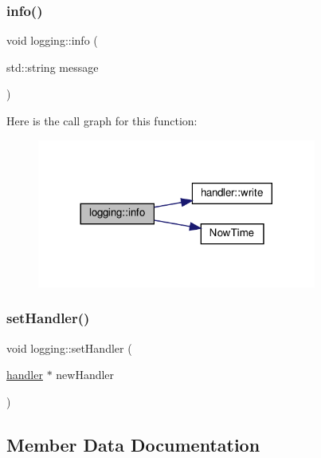 \subsubsection{\texorpdfstring{info()}{info()}}
{\footnotesize\ttfamily void logging\+::info (\begin{DoxyParamCaption}\item[{std\+::string}]{message }\end{DoxyParamCaption})}

Here is the call graph for this function\+:\nopagebreak
\begin{figure}[H]
\begin{center}
\leavevmode
\includegraphics[width=260pt]{d4/d8d/classlogging_aa15fabd099ea702ad39a8bb82e56d56c_cgraph}
\end{center}
\end{figure}
\mbox{\label{classlogging_a3df699bc82c58695050e68f28fa4bf39}} 
\subsubsection{\texorpdfstring{set\+Handler()}{setHandler()}}
{\footnotesize\ttfamily void logging\+::set\+Handler (\begin{DoxyParamCaption}\item[{\hyperlink{classhandler}{handler} $\ast$}]{new\+Handler }\end{DoxyParamCaption})}



\subsection{Member Data Documentation}
\mbox{\label{classlogging_a0bd664aa980c8b51e8ebd84c5f6a3901}} 
